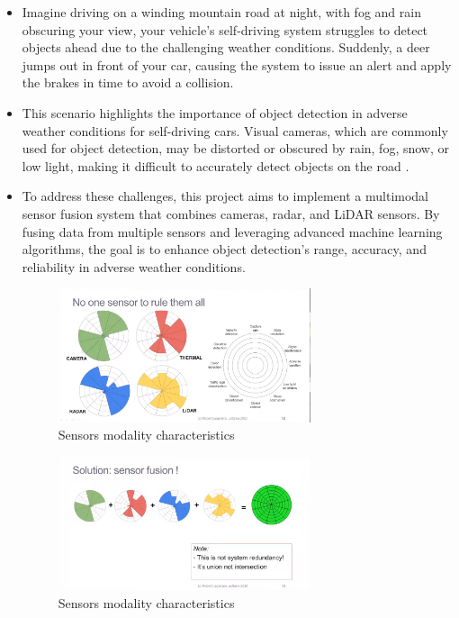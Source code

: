 \documentclass[rnd]{mas_proposal}
\begin{document}
\begin{itemize}
    \item Imagine driving on a winding mountain road at night, with fog and rain obscuring your view, your vehicle's self-driving system struggles to detect objects ahead due to the challenging weather conditions. Suddenly, a deer jumps out in front of your car, causing the system to issue an alert and apply the brakes in time to avoid a collision.

    \item This scenario highlights the importance of object detection in adverse weather conditions for self-driving cars. Visual cameras, which are commonly used for object detection, may be distorted or obscured by rain, fog, snow, or low light, making it difficult to accurately detect objects on the road \cite{yurtsever2020survey} \cite{carballo2020libre} \cite{mcity2020}.

    \item To address these challenges, this project aims to implement a multimodal sensor fusion system that combines cameras, radar, and LiDAR sensors. By fusing data from multiple sensors and leveraging advanced machine learning algorithms, the goal is to enhance object detection's range, accuracy, and reliability in adverse weather conditions.
    
      \begin{figure}[h]
            \centering
            \includegraphics[width=0.7\textwidth]{images/sensors_intro_1.png}
            \caption{Sensors modality characteristics \cite{Sensor_modality_characteristics_1}}
            \label{fig:sensors_intro_1}
      \end{figure}

      \begin{figure}[h]
            \centering
            \includegraphics[width=0.7\textwidth]{images/sensors_intro_2.png}
            \caption{Sensors modality characteristics \cite{Sensor_modality_characteristics_1}}
            \label{fig:sensors_intro_2}
      \end{figure}


\end{itemize}
\end{document}
